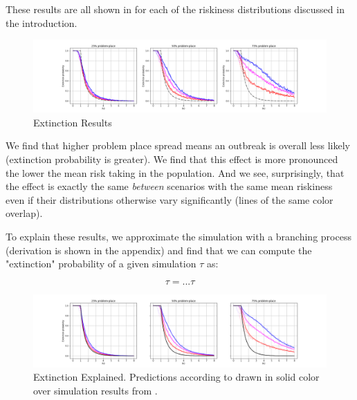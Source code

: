 \documentclass{article}
\begin{document}
These results are all shown in  for each of the riskiness
distributions discussed in the introduction.\\


\begin{figure}
\centering
\includegraphics[width=\textwidth]{extinction_results}
\caption{Extinction Results}
\label{fig:extinction_results}
\end{figure}



We find that higher problem place spread means an outbreak is overall less
likely (extinction probability is greater). We find that this effect is
more pronounced the lower the mean risk taking in the population. And we see,
surprisingly, that the effect is exactly the same \textit{between} scenarios
with the same mean riskiness even if their distributions otherwise vary
significantly (lines of the same color overlap).


To explain these results, we approximate the simulation with a branching process
(derivation is shown in the appendix)
and find that we can compute the "extinction" probability of a given simulation
$\tau$ as:

\begin{equation}
\tau = ... \tau
\label{eqn:extinction}
\end{equation}


\begin{figure}
\centering
\includegraphics[width=\textwidth]{extinction_explained}
\caption{Extinction Explained. Predictions according to 
drawn in solid color over simulation results from .}
\label{fig:extinction_explained}
\end{figure}
\end{document}
